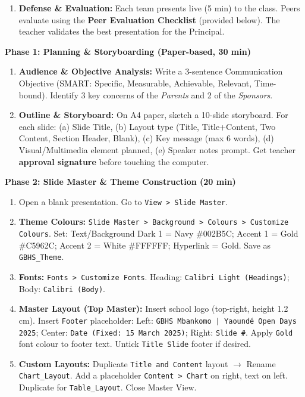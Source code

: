 \documentclass[11pt]{article}
\newcommand{\cle}[1]{{\popxbold\color{popdark}#1}}
\newcounter{popsec}
\newcounter{popsub}
\newcommand{\courssub}[1]{%
  \stepcounter{popsub}%
  \par\vspace{9pt}\noindent{\popxbold\fontsize{11.5}{13}\selectfont\color{popink}{\color{poporange}\thepopsec.\thepopsub}\hspace{6pt}#1}\par\nopagebreak\vspace{4pt}
}
\begin{document}
\begin{enumerate}
\begin{itemize}
            \item \textbf{Rehearsal:} Timings recorded via \cle{Rehearse Timings}. Total show $\le$ 5:00 min.
            \item \textbf{Outputs:} (a) Print \textbf{Handouts (3 slides/page)} with lines for notes. (b) Export \textbf{PDF} (Standard quality). (c) \textbf{Package for CD/USB} (linked media included).
        \end{itemize}
    \item \textbf{Defense \& Evaluation:} Each team presents live (5 min) to the class. Peers evaluate using the \textbf{Peer Evaluation Checklist} (provided below). The teacher validates the best presentation for the Principal.
\end{enumerate}

\courssub{Tasks}
\textbf{Phase 1: Planning \& Storyboarding (Paper-based, 30 min)}
\begin{enumerate}
    \item \textbf{Audience \& Objective Analysis:} Write a 3-sentence \cle{Communication Objective} (SMART: Specific, Measurable, Achievable, Relevant, Time-bound). Identify 3 key concerns of the \emph{Parents} and 2 of the \emph{Sponsors}.
    \item \textbf{Outline \& Storyboard:} On A4 paper, sketch a 10-slide storyboard. For each slide: (a) Slide Title, (b) Layout type (Title, Title+Content, Two Content, Section Header, Blank), (c) Key message (max 6 words), (d) Visual/Multimedia element planned, (e) Speaker notes prompt. Get teacher \textbf{approval signature} before touching the computer.
\end{enumerate}

\textbf{Phase 2: Slide Master \& Theme Construction (20 min)}
\begin{enumerate}[resume]
    \item Open a blank presentation. Go to \texttt{View > Slide Master}.
    \item \textbf{Theme Colours:} \texttt{Slide Master > Background > Colours > Customize Colours}. Set: Text/Background Dark 1 = Navy \#002B5C; Accent 1 = Gold \#C5962C; Accent 2 = White \#FFFFFF; Hyperlink = Gold. Save as \texttt{GBHS\_Theme}.
    \item \textbf{Fonts:} \texttt{Fonts > Customize Fonts}. Heading: \texttt{Calibri Light (Headings)}; Body: \texttt{Calibri (Body)}.
    \item \textbf{Master Layout (Top Master):} Insert school logo (top-right, height 1.2 cm). Insert \texttt{Footer} placeholder: Left: \texttt{GBHS Mbankomo | Yaoundé Open Days 2025}; Center: \texttt{Date (Fixed: 15 March 2025)}; Right: \texttt{Slide \#}. Apply \texttt{Gold} font colour to footer text. Untick \texttt{Title Slide} footer if desired.
    \item \textbf{Custom Layouts:} Duplicate \texttt{Title and Content} layout $\rightarrow$ Rename \texttt{Chart\_Layout}. Add a placeholder \texttt{Content > Chart} on right, text on left. Duplicate for \texttt{Table\_Layout}. Close Master View.
\end{enumerate}
\end{document}
